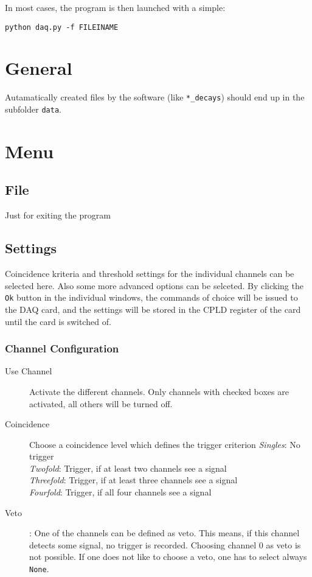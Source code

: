 \documentclass[a4paper,12pt]{article}
\begin{document}
In most cases, the program is then launched with a simple:\\
\begin{center}
\verb|python daq.py -f FILEINAME|
\end{center}

\section{General}
Autamatically created files by the software (like \verb|*_decays|) should end up in the subfolder \verb|data|.

\section{Menu}
\subsection{File}
Just for exiting the program
\subsection{Settings}
Coincidence kriteria and threshold settings for the individual channels can be selected here. Also some more advanced options can be selceted.
By clicking the \verb|Ok| button in the individual windows, the commands of choice will be issued to the DAQ card, and the settings will be stored in the CPLD register of the card until the card is switched of.

\subsubsection{Channel Configuration}
\begin{description}
\item[Use Channel] Activate the different channels. Only channels with checked boxes are activated, all others will be turned off.
\item[Coincidence] Choose a coincidence level which defines the trigger criterion
\emph{Singles}: No trigger\\
\emph{Twofold}: Trigger, if at least two channels see a signal\\
\emph{Threefold}: Trigger, if at least three channels see a signal\\
\emph{Fourfold}: Trigger, if all four channels see a signal\\
\item[Veto]: One of the channels can be defined as veto. This means, if this channel detects some signal, no trigger is recorded. Choosing channel 0 as veto is not possible. If one does not like to choose a veto, one has to select always \verb|None|.
\end{description}
\end{document}
